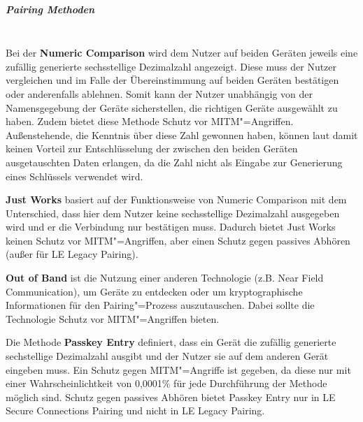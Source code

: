 \subparagraph{Pairing Methoden} \mbox{} \vspace{0.2cm} \\
Bei der \textbf{Numeric Comparison} wird dem Nutzer auf beiden Geräten jeweils eine zufällig generierte sechsstellige Dezimalzahl angezeigt. Diese muss der Nutzer vergleichen und im Falle der Übereinstimmung auf beiden Geräten bestätigen oder anderenfalls ablehnen. Somit kann der Nutzer unabhängig von der Namensgegebung der Geräte sicherstellen, die richtigen Geräte ausgewählt zu haben. Zudem bietet diese Methode Schutz vor MITM"=Angriffen. Außenstehende, die Kenntnis über diese Zahl gewonnen haben, können laut \cite{BtSpec4.2_244-245} damit keinen Vorteil zur Entschlüsselung der zwischen den beiden Geräten ausgetauschten Daten erlangen, da die Zahl nicht als Eingabe zur Generierung eines Schlüssels verwendet wird.

\textbf{Just Works} basiert auf der Funktionsweise von Numeric Comparison mit dem Unterschied, dass hier dem Nutzer keine sechsstellige Dezimalzahl ausgegeben wird und er die Verbindung nur bestätigen muss. Dadurch bietet Just Works keinen Schutz vor MITM"=Angriffen, aber einen Schutz gegen passives Abhören (außer für LE Legacy Pairing). \cite{BtSpec4.2_245}

\textbf{Out of Band} ist die Nutzung einer anderen Technologie (z.B. Near Field Communication), um Geräte zu entdecken oder um kryptographische Informationen für den Pairing"=Prozess auszutauschen. Dabei sollte die Technologie Schutz vor MITM"=Angriffen bieten. \cite{BtSpec4.2_246}

Die Methode \textbf{Passkey Entry} definiert, dass ein Gerät die zufällig generierte sechstellige Dezimalzahl ausgibt und der Nutzer sie auf dem anderen Gerät eingeben muss. Ein Schutz gegen MITM"=Angriffe ist gegeben, da diese nur mit einer Wahrscheinlichtkeit von 0,0001\% für jede Durchführung der Methode möglich sind. Schutz gegen passives Abhören bietet Passkey Entry nur in LE Secure Connections Pairing und nicht in LE Legacy Pairing. \cite{BtSpec4.2_246-247} \cite{BtSpec4.2_2304}

